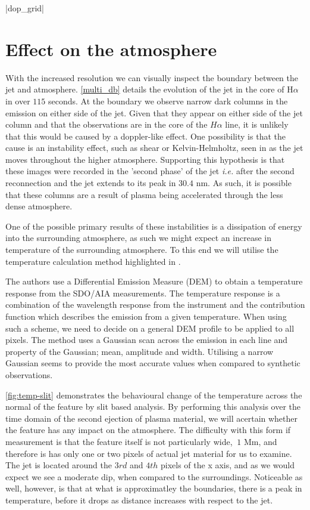 \documentclass{emulateapj}
\begin{document}
\py[DOPPLER]|dop_grid|





\section{Effect on the atmosphere}
\label{temp_map_sect}

With the increased resolution we can visually inspect the boundary between the jet and atmosphere.
\cref{multi_db} details the evolution of the jet in the core of H$\alpha$ in over $115$ seconds.
At the boundary we observe narrow dark columns in the emission on either side of the jet.
Given that they appear on either side of the jet column and that the observations are in the core of the $H\alpha$ line, it is unlikely that this would be caused by a doppler-like effect.
One possibility is that the cause is an instability effect, such as shear or Kelvin-Helmholtz, seen in \cite{Zaqarashvili2014} as the jet moves throughout the higher atmosphere.
Supporting this hypothesis is that these images were recorded in the 'second phase' of the jet \emph{i.e.} after the second reconnection and the jet extends to its peak in $30.4$ nm. 
As such, it is possible that these columns are a result of plasma being accelerated through the less dense atmosphere.

One of the possible primary results of these instabilities is a dissipation of energy into the surrounding atmosphere, as such we might expect an increase in temperature of the surrounding atmosphere.
To this end we will utilise the temperature calculation method highlighted in \cite{Leonard2014}.

The authors use a Differential Emission Measure (DEM) to obtain a temperature response from the SDO/AIA measurements.
The temperature response is a combination of the wavelength response from the instrument and the contribution function which describes the emission from a given temperature.
When using such a scheme, we need to decide on a general DEM profile to be applied to all pixels.
The method uses a Gaussian scan across the emission in each line and property of the Gaussian; mean, amplitude and width. 
Utilising a narrow Gaussian seems to provide the most accurate values when compared to synthetic observations.

\cref{fig:temp-slit} demonstrates the behavioural change of the temperature across the normal of the feature by slit based analysis.
By performing this analysis over the time domain of the second ejection of plasma material, we will acertain whether the feature has any impact on the atmosphere.
The difficulty with this form if measurement is that the feature itself is not particularly wide, $~1$ Mm, and therefore is has only one or two pixels of actual jet material for us to examine.
The jet is located around the $3rd$ and $4th$ pixels of the x axis, and as we would expect we see a moderate dip, when compared to the surroundings. 
Noticeable as well, however, is that at what is approximatley the boundaries, there is a peak in temperature, before it drops as distance increases with respect to the jet.
\end{document}

